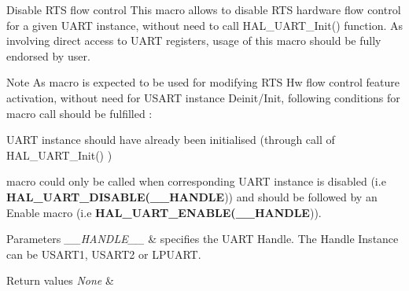 Disable R\+TS flow control This macro allows to disable R\+TS hardware flow control for a given U\+A\+RT instance, without need to call H\+A\+L\+\_\+\+U\+A\+R\+T\+\_\+\+Init() function. As involving direct access to U\+A\+RT registers, usage of this macro should be fully endorsed by user. 

\begin{DoxyNote}{Note}
As macro is expected to be used for modifying R\+TS Hw flow control feature activation, without need for U\+S\+A\+RT instance Deinit/\+Init, following conditions for macro call should be fulfilled \+:
\begin{DoxyItemize}
\item U\+A\+RT instance should have already been initialised (through call of H\+A\+L\+\_\+\+U\+A\+R\+T\+\_\+\+Init() )
\item macro could only be called when corresponding U\+A\+RT instance is disabled (i.\+e {\bfseries H\+A\+L\+\_\+\+U\+A\+R\+T\+\_\+\+D\+I\+S\+A\+B\+LE(\+\_\+\+\_\+\+H\+A\+N\+D\+LE})) and should be followed by an Enable macro (i.\+e {\bfseries H\+A\+L\+\_\+\+U\+A\+R\+T\+\_\+\+E\+N\+A\+B\+LE(\+\_\+\+\_\+\+H\+A\+N\+D\+LE})). 
\end{DoxyItemize}
\end{DoxyNote}

\begin{DoxyParams}{Parameters}
{\em \+\_\+\+\_\+\+H\+A\+N\+D\+L\+E\+\_\+\+\_\+} & specifies the U\+A\+RT Handle. The Handle Instance can be U\+S\+A\+R\+T1, U\+S\+A\+R\+T2 or L\+P\+U\+A\+RT. \\
\hline
\end{DoxyParams}

\begin{DoxyRetVals}{Return values}
{\em None} & \\
\hline
\end{DoxyRetVals}
\mbox{\label{group___u_a_r_t___exported___macros_ga017ec9001ff33136f87cc4034b2709a6}} 

